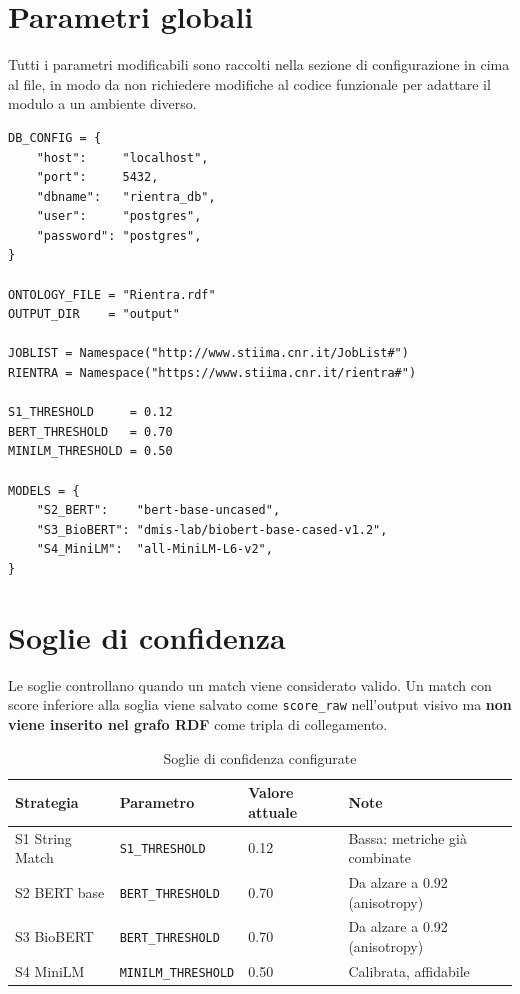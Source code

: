 \documentclass[12pt, a4paper]{report}
\begin{document}
\section{Parametri globali}

Tutti i parametri modificabili sono raccolti nella sezione di
configurazione in cima al file, in modo da non richiedere modifiche
al codice funzionale per adattare il modulo a un ambiente diverso.

\begin{lstlisting}[caption={Sezione di configurazione}]
DB_CONFIG = {
    "host":     "localhost",
    "port":     5432,
    "dbname":   "rientra_db",
    "user":     "postgres",
    "password": "postgres",
}

ONTOLOGY_FILE = "Rientra.rdf"
OUTPUT_DIR    = "output"

JOBLIST = Namespace("http://www.stiima.cnr.it/JobList#")
RIENTRA = Namespace("https://www.stiima.cnr.it/rientra#")

S1_THRESHOLD     = 0.12
BERT_THRESHOLD   = 0.70
MINILM_THRESHOLD = 0.50

MODELS = {
    "S2_BERT":    "bert-base-uncased",
    "S3_BioBERT": "dmis-lab/biobert-base-cased-v1.2",
    "S4_MiniLM":  "all-MiniLM-L6-v2",
}
\end{lstlisting}

\section{Soglie di confidenza}

Le soglie controllano quando un match viene considerato valido. Un
match con score inferiore alla soglia viene salvato come
\texttt{score\_raw} nell'output visivo ma \textbf{non viene inserito
nel grafo RDF} come tripla di collegamento.

\begin{table}[H]
\centering
\begin{tabular}{llll}
\toprule
\textbf{Strategia} & \textbf{Parametro} & \textbf{Valore attuale} &
\textbf{Note} \\
\midrule
S1 String Match  & \texttt{S1\_THRESHOLD}     & 0.12 & Bassa: metriche già combinate \\
S2 BERT base     & \texttt{BERT\_THRESHOLD}   & 0.70 & Da alzare a 0.92 (anisotropy) \\
S3 BioBERT       & \texttt{BERT\_THRESHOLD}   & 0.70 & Da alzare a 0.92 (anisotropy) \\
S4 MiniLM        & \texttt{MINILM\_THRESHOLD} & 0.50 & Calibrata, affidabile \\
\bottomrule
\end{tabular}
\caption{Soglie di confidenza configurate}
\end{table}
\end{document}
